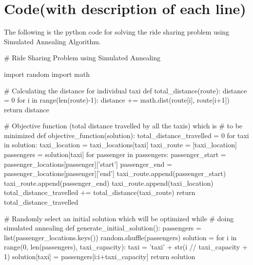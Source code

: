 \documentclass{article}
\begin{document}
\section{Code(with description of each line)}
The following is the python code for solving the ride sharing problem using Simulated Annealing Algorithm.
\begin{pythoncode}
# Ride Sharing Problem using Simulated Annealing

import random
import math

# Calculating the distance for individual taxi
def total_distance(route):
  distance = 0
  for i in range(len(route)-1):
    distance += math.dist(route[i], route[i+1])
  return distance

# Objective function (total distance travelled by all the taxis) which is 
# to be minimized
def objective_function(solution):
  total_distance_travelled = 0
  for taxi in solution:
    taxi_location = taxi_locations[taxi]
    taxi_route = [taxi_location]
    passengers = solution[taxi]
    for passenger in passengers:
      passenger_start = passenger_locations[passenger]['start']
      passenger_end = passenger_locations[passenger]['end']
      taxi_route.append(passenger_start)
      taxi_route.append(passenger_end)
    taxi_route.append(taxi_location)
    total_distance_travelled += total_distance(taxi_route)
  return total_distance_travelled

# Randomly select an initial solution which will be optimized while
# doing simulated annealing
def generate_initial_solution():
  passengers = list(passenger_locations.keys())
  random.shuffle(passengers)
  solution = {}
  for i in range(0, len(passengers), taxi_capacity):
    taxi = 'taxi' + str(i // taxi_capacity + 1)
    solution[taxi] = passengers[i:i+taxi_capacity]
  return solution
\end{pythoncode}

\newpage
\end{document}
